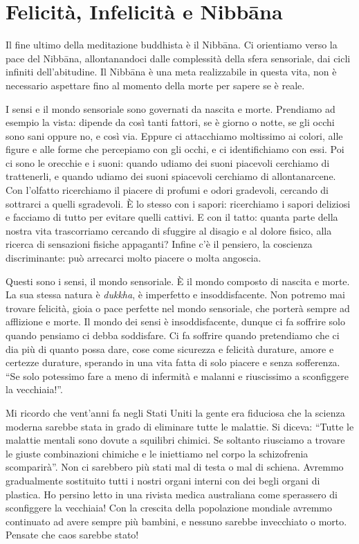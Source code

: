 \chapter{Felicità, Infelicità e Nibbāna}

Il fine ultimo della meditazione buddhista è il Nibbāna. Ci orientiamo
verso la pace del Nibbāna, allontanandoci dalle complessità della sfera
sensoriale, dai cicli infiniti dell'abitudine. Il Nibbāna è una meta
realizzabile in questa vita, non è necessario aspettare fino al momento
della morte per sapere se è reale.

I sensi e il mondo sensoriale sono governati da nascita e morte.
Prendiamo ad esempio la vista: dipende da così tanti fattori, se è
giorno o notte, se gli occhi sono sani oppure no, e così via. Eppure ci
attacchiamo moltissimo ai colori, alle figure e alle forme che
percepiamo con gli occhi, e ci identifichiamo con essi. Poi ci sono le
orecchie e i suoni: quando udiamo dei suoni piacevoli cerchiamo di
trattenerli, e quando udiamo dei suoni spiacevoli cerchiamo di
allontanarcene. Con l'olfatto ricerchiamo il piacere di profumi e odori
gradevoli, cercando di sottrarci a quelli sgradevoli.
\protect\hypertarget{__DdeLink__546_1053081209}{}{}È lo stesso con i
sapori: ricerchiamo i sapori deliziosi e facciamo di tutto per evitare
quelli cattivi. E con il tatto: quanta parte della nostra vita
trascorriamo cercando di sfuggire al disagio e al dolore fisico, alla
ricerca di sensazioni fisiche appaganti? Infine c'è il pensiero, la
coscienza discriminante: può arrecarci molto piacere o molta angoscia.

Questi sono i sensi, il mondo sensoriale. È il mondo composto di nascita
e morte. La sua stessa natura è \emph{dukkha}, è imperfetto e
insoddisfacente. Non potremo mai trovare felicità, gioia o pace perfette
nel mondo sensoriale, che porterà sempre ad afflizione e morte. Il mondo
dei sensi è insoddisfacente, dunque ci fa soffrire solo quando pensiamo
ci debba soddisfare. Ci fa soffrire quando pretendiamo che ci dia più di
quanto possa dare, cose come sicurezza e felicità durature, amore e
certezze durature, sperando in una vita fatta di solo piacere e senza
sofferenza. ``Se solo potessimo fare a meno di infermità e malanni e
riuscissimo a sconfiggere la vecchiaia!''.

Mi ricordo che vent'anni fa negli Stati Uniti la gente era fiduciosa che
la scienza moderna sarebbe stata in grado di eliminare tutte le
malattie. Si diceva: ``Tutte le malattie mentali sono dovute a squilibri
chimici. Se soltanto riusciamo a trovare le giuste combinazioni chimiche
e le iniettiamo nel corpo la schizofrenia scomparirà''. Non ci sarebbero
più stati mal di testa o mal di schiena. Avremmo gradualmente sostituito
tutti i nostri organi interni con dei begli organi di plastica. Ho
persino letto in una rivista medica australiana come sperassero di
sconfiggere la vecchiaia! Con la crescita della popolazione mondiale
avremmo continuato ad avere sempre più bambini, e nessuno sarebbe
invecchiato o morto. Pensate che caos sarebbe stato!

